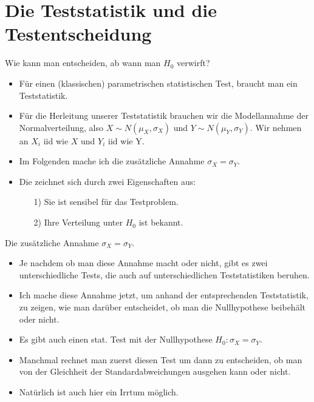 \documentclass[usenames,dvipsnames,handout]{beamer}
\begin{document}
\section{Die Teststatistik und die Testentscheidung}

\begin{frame}{Wie kann man entscheiden, ab wann man $H_{0}$ verwirft?}
\begin{itemize}
\item{Für einen (klassischen) parametrischen statistischen Test, braucht man ein Teststatistik.}\pause
\item{Für die Herleitung unserer Teststatistik brauchen wir die Modellannahme der Normalverteilung,
also $X \sim N(\mu_{X},\sigma_{X})$ und $Y \sim N(\mu_{Y},\sigma_{Y}).$ 
Wir nehmen an $X_{i}$ iid wie $X$ und $Y_{i}$ iid wie Y.}\pause
\item{Im Folgenden mache ich die zusätzliche Annahme $\sigma_{X}=\sigma_{Y}.$}
\item{Die zeichnet sich durch zwei Eigenschaften aus:}
\begin{itemize}
\item[1)]{Sie ist sensibel für das Testproblem.}
\item[2)]{Ihre Verteilung unter $H_{0}$ ist bekannt.}
\end{itemize}
\end{itemize}
\end{frame}

\begin{frame}{Die zusätzliche Annahme $\sigma_{X}=\sigma_{Y}.$}
\begin{itemize}
\item{Je nachdem ob man diese Annahme macht oder nicht, gibt es zwei unterschiedliche Tests,
die auch auf unterschiedlichen Teststatistiken beruhen.}\pause
\item{Ich mache diese Annahme jetzt, um anhand der entsprechenden Teststatistik, zu zeigen,
wie man darüber entscheidet, ob man die Nullhypothese beibehält oder nicht.}\pause
\item{Es gibt auch einen stat. Test mit der Nullhypothese  $H_{0}: \sigma_{X}=\sigma_{Y}.$ }\pause
\item{Manchmal rechnet man zuerst diesen Test um dann zu entscheiden, ob man von der Gleichheit
der Standardabweichungen ausgehen kann oder nicht. }
\item{Natürlich ist auch hier ein Irrtum möglich.}
\end{itemize}
\end{frame}
\end{document}
